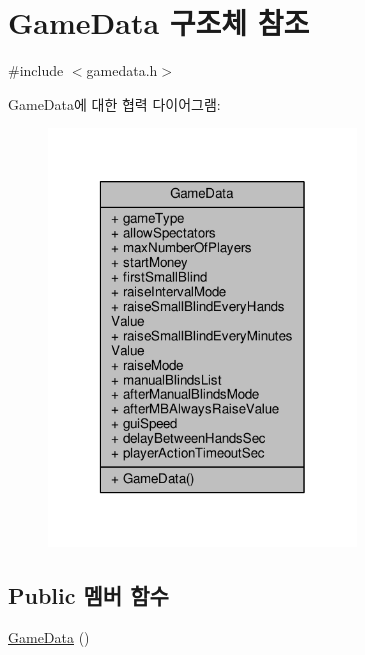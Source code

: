 \hypertarget{struct_game_data}{\section{Game\-Data 구조체 참조}
\label{struct_game_data}
}


{\ttfamily \#include $<$gamedata.\-h$>$}



Game\-Data에 대한 협력 다이어그램\-:\nopagebreak
\begin{figure}[H]
\begin{center}
\leavevmode
\includegraphics[width=232pt]{struct_game_data__coll__graph}
\end{center}
\end{figure}
\subsection*{Public 멤버 함수}
\begin{DoxyCompactItemize}
\item 
\hyperlink{struct_game_data_a67ab18c5a35df618e99983275c7552ab}{Game\-Data} ()
\end{DoxyCompactItemize}
